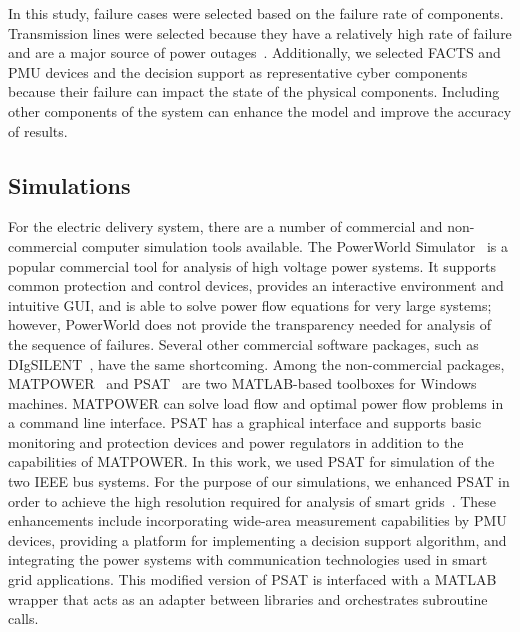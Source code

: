 \documentclass[12pt]{elsarticle}
\begin{document}
In this study, failure cases were selected based on the failure rate of components. Transmission lines were selected because they have a relatively high rate of failure and are a major source of power outages~\cite{SoW13}. Additionally, we selected FACTS and PMU devices and the decision support as representative cyber components because their failure can impact the state of the physical components. Including other components of the system can enhance the model and improve the accuracy of results.

\subsection{Simulations}
\label{sec:case_study:sim}
For the electric delivery system, there are a number of commercial and non-commercial computer simulation tools available. The PowerWorld Simulator~\cite{PwrWrld} is a popular commercial tool for analysis of high voltage power systems. It supports common protection and control devices, provides an interactive environment and intuitive GUI, and is able to solve power flow equations for very large systems; however, PowerWorld does not provide the transparency needed for analysis of the sequence of failures. Several other commercial software packages, such as DIgSILENT~\cite{DIg}, have the same shortcoming. Among the non-commercial packages, MATPOWER~\cite{MATPWR} and PSAT~\cite{Mi05} are two MATLAB-based toolboxes for Windows machines. MATPOWER can solve load flow and optimal power flow problems in a command line interface. PSAT has a graphical interface and supports basic monitoring and protection devices and power regulators in addition to the capabilities of MATPOWER. In this work, we used PSAT for simulation of the two IEEE bus systems. For the purpose of our simulations, we enhanced PSAT in order to achieve the high resolution required for analysis of smart grids~\cite{MaS14,MaS18}. These enhancements include incorporating wide-area measurement capabilities by PMU devices, providing a platform for implementing a decision support algorithm, and integrating the power systems with communication technologies used in smart grid applications. This modified version of PSAT is interfaced with a MATLAB wrapper that acts as an adapter between libraries and orchestrates subroutine calls.
\end{document}

